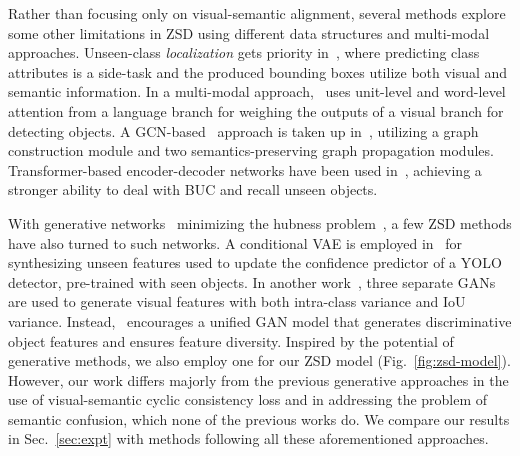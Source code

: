 \documentclass{bmvc2k}
\begin{document}
Rather than focusing only on visual-semantic alignment, several methods explore some other limitations in ZSD using different data structures and multi-modal approaches. Unseen-class {\em localization} gets priority in~\cite{zhu2019learning}, where predicting class attributes is a side-task and the produced bounding boxes utilize both visual and semantic information. In a multi-modal approach,~\cite{li2019zero} uses unit-level and word-level attention from a language branch for weighing the outputs of a visual branch for detecting objects. A GCN-based~\cite{welling2016semi} approach is taken up in~\cite{yan2020semantics}, utilizing a graph construction module and two semantics-preserving graph propagation modules. Transformer-based encoder-decoder networks have been used in~\cite{zheng2021zero}, achieving a stronger ability to deal with BUC and recall unseen objects.

With generative networks~\cite{goodfellow2014generative, DBLP:journals/corr/KingmaW13} minimizing the hubness problem~\cite{radovanovic2010hubs}, a few ZSD methods have also turned to such networks. A conditional VAE is employed in~\cite{zhu2020don} for synthesizing unseen features used to update the confidence predictor of a YOLO~\cite{redmon2017yolo9000} detector, pre-trained with seen objects. In another work~\cite{zhao2020gtnet}, three separate GANs are used to generate visual features with both intra-class variance and IoU variance. Instead,~\cite{hayat2020synthesizing} encourages a unified GAN model that generates discriminative object features and ensures feature diversity. Inspired by the potential of generative methods, we also employ one for our ZSD model (Fig.~\ref{fig:zsd-model}). However, our work differs majorly from the previous generative approaches in the use of visual-semantic cyclic consistency loss and in addressing the problem of semantic confusion, which none of the previous works do. We compare our results in Sec.~\ref{sec:expt} with methods following all these aforementioned approaches. 
\end{document}
